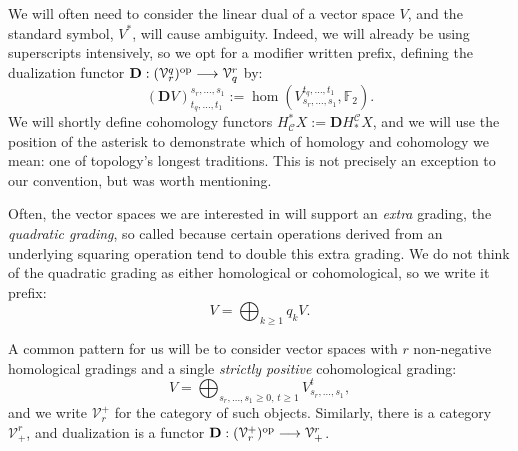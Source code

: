 \documentclass[11pt]{amsart}
\theoremstyle{plain}
\theoremstyle{definition}
\renewcommand{\to}{\longrightarrow}
\newcommand{\calV}{\mathcal{V}}
\newcommand{\calc}{\mathcal{C}}
\theoremstyle{plain}
\newcommand{\vect}[2]{\calV^{#1}_{#2}}
\newcommand{\F}{\mathbb{F}}
\newcommand{\Ftwo}{\F_2}
\newcommand{\dual}{\mathbf{D}}
\begin{document}
\begin{Conventions and notation}
We will often need to consider the linear dual of a vector space $V$, and the standard symbol, $V^*$, will cause ambiguity. Indeed, we will already be using superscripts intensively, so we opt for a modifier written prefix, defining the dualization functor
$\dual:(\vect{q}{r})^\textup{op}\to\vect{r}{q}$ by:
\[(\dual V)_{t_q,\ldots,t_1}^{s_r,\ldots,s_1}:=\hom(V^{t_q,\ldots,t_1}_{s_r,\ldots,s_1},\Ftwo ).\]
We will shortly define cohomology functors
$H_{\calc}^*X:=\dual H^{\calc}_*X$, and we will use the position of the asterisk to demonstrate which of homology and cohomology we mean: one of topology's longest traditions. This is not precisely an exception to our convention, but was worth mentioning.

Often, the vector spaces we are interested in will support an \emph{extra} grading, the \emph{quadratic grading}, so called because certain operations derived from an underlying squaring operation tend to double this extra grading. We do not think of the quadratic grading as either homological or cohomological, so we write it prefix:
\[V=\textstyle\bigoplus_{k\geq1}q_kV.\]


A common pattern for us will be to consider vector spaces with $r$ non-negative homological gradings and a single \emph{strictly positive} cohomological grading:
\[V=\bigoplus_{s_r,\ldots,s_1\geq0,\,t\geq 1}V^{t}_{s_r,\ldots,s_1},\]
and we write $\vect{+}{r}$ for the category of such objects. Similarly, there is a category $\vect{r}{+}$, and  dualization is a functor $\dual:(\vect{+}{r})^\textup{op}\to\vect{r}{+}$.



\end{Conventions and notation}
\end{document}
